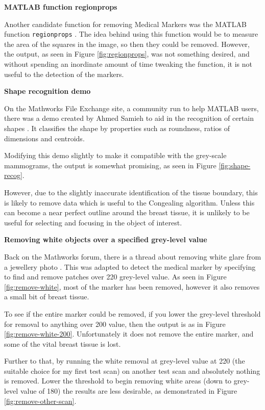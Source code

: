\noindent \textbf{MATLAB function regionprops}

Another candidate function for removing Medical Markers was the MATLAB function \texttt{regionprops} \cite{regionprops}. The idea behind using this function would be to measure the area of the squares in the image, so then they could be removed. However, the output, as seen in Figure \ref{fig:regionprops}, was not something desired, and without spending an inordinate amount of time tweaking the function, it is not useful to the detection of the markers.

\noindent \textbf{Shape recognition demo}

On the Mathworks File Exchange site, a community run to help MATLAB users, there was a demo created by Ahmed Samieh to aid in the recognition of certain shapes \cite{shape_recognition}. It classifies the shape by properties such as roundness, ratios of dimensions and centroids.

Modifying this demo slightly to make it compatible with the grey-scale mammograms, the output is somewhat promising, as seen in Figure \ref{fig:shape-recog}.

However, due to the slightly inaccurate identification of the tissue boundary, this is likely to remove data which is useful to the \Gls{Congealing} algorithm. Unless this can become a near perfect outline around the breast tissue, it is unlikely to be useful for selecting and focusing in the object of interest.

\noindent  \textbf{Removing white objects over a specified grey-level value}

Back on the Mathworks forum, there is a thread about removing white glare from a jewellery photo \cite{remove_white}. This was adapted to detect the medical marker by specifying to find and remove patches over 220 grey-level value. As seen in Figure \ref{fig:remove-white}, most of the marker has been removed, however it also removes a small bit of breast tissue.

To see if the entire marker could be removed, if you lower the grey-level threshold for removal to anything over 200 value, then the output is as in Figure \ref{fig:remove-white-200}. Unfortunately it does not remove the entire marker, and some of the vital breast tissue is lost.

Further to that, by running the white removal at grey-level value at 220 (the suitable choice for my first test scan) on another test scan and absolutely nothing is removed. Lower the threshold to begin removing white areas (down to grey-level value of 180) the results are less desirable, as demonstrated in Figure \ref{fig:remove-other-scan}.

